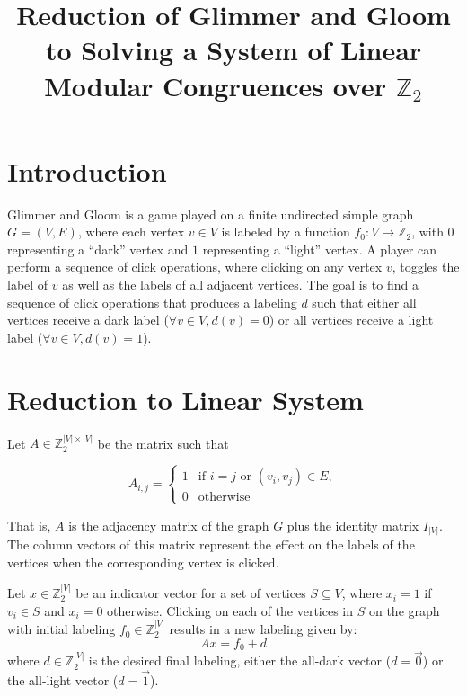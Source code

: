 \documentclass{article}
\title{Reduction of Glimmer and Gloom to Solving a System of Linear Modular Congruences over \(\mathbb{Z}_2\)}
\begin{document}
\maketitle

\section{Introduction}

Glimmer and Gloom is a game played on a finite undirected simple graph \( G = (V, E) \), where each vertex \( v \in V \) is labeled by a function \( f_0: V \to \mathbb{Z}_2 \), with \( 0 \) representing a ``dark'' vertex and \( 1 \) representing a ``light'' vertex. A player can perform a sequence of click operations, where clicking on any vertex \( v \),  toggles the label of \( v \) as well as the labels of all adjacent vertices. The goal is to find a sequence of click operations that produces a labeling \( d \) such that either all vertices receive a dark label (\(\forall v \in V, d(v) = 0 \)) or all vertices receive a light label (\( \forall v \in V, d(v) = 1 \)).

\section{Reduction to Linear System}

Let \( A \in \mathbb{Z}_2^{|V| \times |V|} \) be the matrix such that

\[
  A_{i,j} =
  \begin{cases}
        1 & \text{if } i = j \text{ or } (v_i, v_j) \in E, \\
        0 & \text{otherwise}
  \end{cases}
\]

That is, \( A \) is the adjacency matrix of the graph \( G \) plus the identity matrix \( I_{|V|} \). The column vectors of this matrix represent the effect on the labels of the vertices when the corresponding vertex is clicked.

Let  \( x \in \mathbb{Z}_2^{|V|} \) be an indicator vector for a set of vertices \( S \subseteq V \), where \( x_i = 1 \) if \( v_i \in S \) and \( x_i = 0 \) otherwise. Clicking on each of the vertices in \( S \) on the graph with initial labeling \( f_0 \in \mathbb{Z}_2^{|V|} \) results in a new labeling given by:
\[
    A x = f_0 + d
\]
where \( d \in \mathbb{Z}_2^{|V|} \) is the desired final labeling, either the all-dark vector (\( d = \vec{0} \)) or the all-light vector (\( d = \vec{1} \)).
\end{document}
